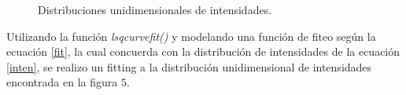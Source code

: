 \documentclass[11pt,letterpaper,twocolumn]{article}
\begin{document}
\begin{figure}[h!]
\begin{center}
\caption{Distribuciones unidimensionales de intensidades.}
\end{center}
\label{distribuciones1D}
\end{figure}
\par 
Utilizando la función \textit{lsqcurvefit()} y modelando una función de fiteo según la ecuación \ref{fit}, la cual concuerda con la distribución de intensidades de la ecuación \ref{inten}, se realizo un fitting a la distribución unidimensional de intensidades encontrada en la figura $5$.\\
\end{document}
